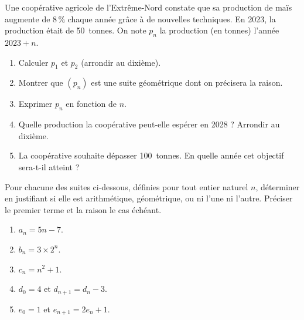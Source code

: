 \documentclass[11pt]{article}
\begin{document}
\begin{exercice}
Une coopérative agricole de l'Extrême-Nord constate que sa production de maïs augmente de $8\,\%$ chaque année grâce à de nouvelles techniques. En 2023, la production était de \SI{50}{tonnes}. On note $p_n$ la production (en tonnes) l'année $2023 + n$.
\begin{enumerate}
\item Calculer $p_1$ et $p_2$ (arrondir au dixième).
\item Montrer que $(p_n)$ est une suite géométrique dont on précisera la raison.
\item Exprimer $p_n$ en fonction de $n$.
\item Quelle production la coopérative peut-elle espérer en 2028 ? Arrondir au dixième.
\item La coopérative souhaite dépasser \SI{100}{tonnes}. En quelle année cet objectif sera-t-il atteint ?
\end{enumerate}
\end{exercice}

\begin{exercice}
Pour chacune des suites ci-dessous, définies pour tout entier naturel $n$, déterminer en justifiant si elle est arithmétique, géométrique, ou ni l'une ni l'autre. Préciser le premier terme et la raison le cas échéant.
\begin{enumerate}
\item $a_n = 5n - 7$.
\item $b_n = 3 \times 2^n$.
\item $c_n = n^2 + 1$.
\item $d_0 = 4$ et $d_{n+1} = d_n - 3$.
\item $e_0 = 1$ et $e_{n+1} = 2e_n + 1$.
\end{enumerate}
\end{exercice}
\end{document}
